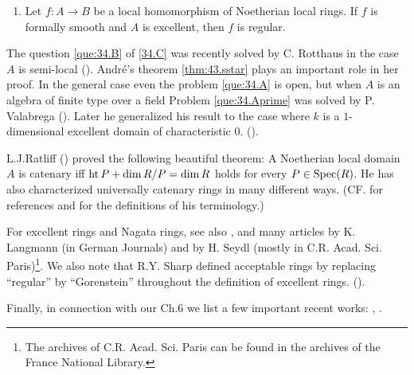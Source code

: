 \documentclass[../main]{subfiles}
\begin{document}
\begin{enumerate}[label=$(**)$]
    \item\label{thm:43.sstar} Let $f: A\longrightarrow B$ be a local homomorphism of Noetherian local rings. If $f$ is formally smooth and $A$ is excellent, then $f$ is regular.
\end{enumerate}
The question \ref{que:34.B} of \ref{34.C} was recently solved by C. Rotthaus in the case $A$ is semi-local (\cite{rotthaus1979komplettierung}). André's theorem \ref{thm:43.sstar} plays an important role in her proof. In the general case even the problem \ref{que:34.A} is open, but when $A$ is an algebra of finite type over a field Problem \ref{que:34.Aprime} was solved by P. Valabrega (\cite{valabrega1975on}). Later he generalized his result to the case where $k$ is a $1$-dimensional excellent domain of characteristic $0$. (\cite{valabrega1976a}).

L.J.Ratliff (\cite{ratliff1972catenary}) proved the following beautiful theorem: A Noetherian local domain $A$ is catenary iff $\operatorname{ht} P+\operatorname{dim} R / P=\operatorname{dim} R$ holds for every $P \in\operatorname{Spec}(R)$. He has also characterized universally catenary rings in many different ways. (CF. \cite{ratliff1978chain} for references and for the definitions of his terminology.)

For excellent rings and Nagata rings, see also \cite{greco1976two}, and many articles by K. Langmann (in German Journals) and by H. Seydl (mostly in C.R. Acad. Sci. Paris)\footnote{The archives of C.R. Acad. Sci. Paris can be found in the archives of the France National Library.}. We also note that R.Y. Sharp defined acceptable rings by replacing ``regular'' by ``Gorenstein'' throughout the definition of excellent rings. (\cite{sharp1977acceptable}).

Finally, in connection with our Ch.6 we list a few important recent works: \cite{northcott1976finite}, \cite{peskineszpiro1973dimension}
\cite{hochster1975topics}.
\end{document}
